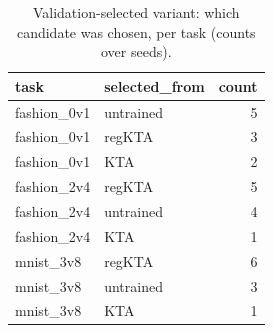 \begin{table}
\caption{Validation-selected variant: which candidate was chosen, per task (counts over seeds).}
\label{tab:table3_valsel_choice}
\begin{tabular}{llr}
\toprule
task & selected\_from & count \\
\midrule
fashion\_0v1 & untrained & 5 \\
fashion\_0v1 & regKTA & 3 \\
fashion\_0v1 & KTA & 2 \\
fashion\_2v4 & regKTA & 5 \\
fashion\_2v4 & untrained & 4 \\
fashion\_2v4 & KTA & 1 \\
mnist\_3v8 & regKTA & 6 \\
mnist\_3v8 & untrained & 3 \\
mnist\_3v8 & KTA & 1 \\
\bottomrule
\end{tabular}
\end{table}
